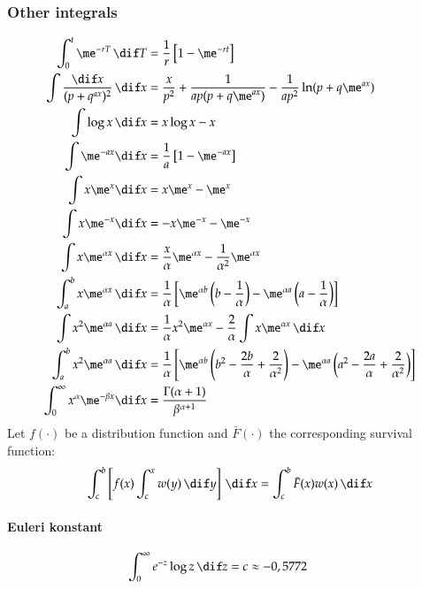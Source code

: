 \documentclass[a4paper]{article}
\numberwithin{equation}{subsection}
\begin{document}
\subsubsection{Other integrals}

\begin{align}
  \int_0^t \me^{-rT} \,\dif T
  &=
  \frac{1}{r}
  \left[
    1 - \me^{-rt}
  \right]
  \\
  \int \frac{\dif x}{(p + q^{ax})^2} \,\dif x 
  &=
  \frac{x}{p^2} +
  \frac{1}{ap(p + q\me^{ax})} -
  \frac{1}{ap^2} \ln (p + q\me^{ax})
  \\
  \int \log x \,\dif x 
  &=
  x \log x - x
  \\
  \int \me^{-ax} \dif x 
  &=
  \frac{1}{a} \left[ 1 - \me^{-ax} \right]\\
  \int x \me^x \dif x 
  &=
  x \me^x - \me^x\\
  \int x \me^{-x} \dif x
  &=
  -x \me^{-x} - \me^{-x}
  \\
  \int x \me^{\alpha x} \,\dif x
  &=
  \frac{x}{\alpha} \me^{\alpha x} - \frac{1}{\alpha^2} \me^{\alpha x}
  \\
  \int_a^b x \me^{\alpha x} \,\dif x
  &=
  \frac{1}{\alpha}
  \left[
    \me^{\alpha b} 
    \left(b - \frac{1}{\alpha}\right)
    -
    \me^{\alpha a} 
    \left(a - \frac{1}{\alpha}\right)
  \right]
  \\
  \int x^2 \me^{\alpha a} \,\dif x
  &=
  \frac{1}{\alpha} x^2 \me^{\alpha x} -
  \frac{2}{\alpha} \int x \me^{\alpha x} \,\dif x
  \\
  \int_a^b x^2 \me^{\alpha a} \,\dif x
  &=
  \frac{1}{\alpha}
  \left[
    \me^{\alpha b}
    \left(
      b^2 - \frac{2b}{\alpha} + \frac{2}{\alpha^2}
    \right)
    -
    \me^{\alpha a}
    \left(
      a^2 - \frac{2a}{\alpha} + \frac{2}{\alpha^2}
    \right)
  \right]
  \\
  \int_0^\infty x^\alpha \me^{-\beta x} \dif x 
  &=
  \frac{\Gamma(\alpha + 1)}{\beta^{\alpha+1}}
\end{align}
Let $f(\cdot)$ be a distribution function and $\bar F(\cdot)$ the
corresponding survival function:
\begin{equation}
  \int_c^b \left[
    f(x)
    \int_c^x w(y) \,\dif y
  \right]
  \,\dif x
  =
  \int_c^b
  \bar F(x) w(x) \,\dif x
\end{equation}


\paragraph{Euleri konstant}
\begin{equation}
\int_0^\infty e^{-z} \log z \,\dif z = c \approx -0,5772 \qquad
\end{equation}
\end{document}
